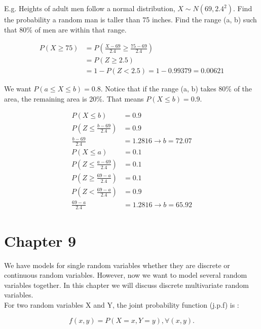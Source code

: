 \documentclass[12pt, letterpaper]{article}
\begin{document}
E.g. Heights of adult men follow a normal distribution, \(X \sim N(69, 2.4^2)\). Find the probability a random man is taller than 75 inches. Find the range (a, b) such that 80\% of men are within that range.

\begin{align*}
P\left(X \geq 75\right) &= P\left(\frac{X - 69}{2.4} \geq \frac{75 - 69}{2.4}\right)\\
&= P\left(Z \geq 2.5\right)\\
&= 1 - P\left(Z < 2.5\right) = 1 - 0.99379 = 0.00621
\end{align*}

We want \(P\left(a \leq X \leq b\right) = 0.8\). Notice that if the range (a, b) takes 80\% of the area, the remaining area is 20\%. That means $P\left(X \leq b\right) = 0.9$.

\begin{align*}
P\left(X \leq b\right) &= 0.9\\
P\left(Z \leq \frac{b - 69}{2.4}\right) &= 0.9\\
\frac{b - 69}{2.4} &= 1.2816 \rightarrow b = 72.07
\end{align*}
\begin{align*}
P\left(X \leq a\right) &= 0.1\\
P\left(Z \leq \frac{a - 69}{2.4}\right) &= 0.1\\
P\left(Z \geq \frac{69 - a}{2.4}\right) &= 0.1\\
P\left(Z < \frac{69 - a}{2.4}\right) &= 0.9\\
\frac{69 - a}{2.4} &= 1.2816 \rightarrow b = 65.92
\end{align*}

\newpage

\section{Chapter 9}
We have models for single random variables whether they are discrete or continuous random variables.  However, now we want to model several random variables together. In this chapter we will discuss discrete multivariate random variables.\\

For two random variables X and Y, the joint probability function (j.p.f) is :

\begin{equation}
f\left(x, y\right) = P\left(X = x, Y = y\right), \forall (x, y).
\end{equation}\\
\end{document}
